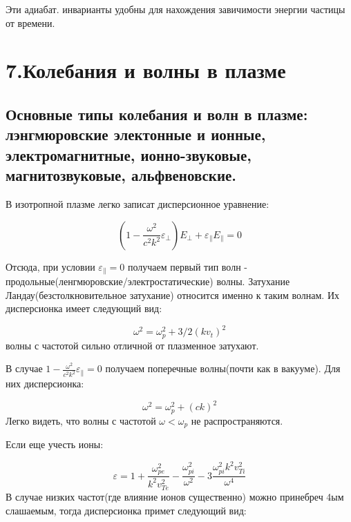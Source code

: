 \documentclass[10pt, a4paper]{article}
\begin{document}
Эти адиабат. инварианты удобны для нахождения завичимости энергии частицы от времени.


\section{ 7.Колебания и волны в плазме}
\label{sec.7}

\subsection{Основные типы колебания и волн в плазме: лэнгмюровские электонные и ионные, электромагнитные, ионно-звуковые, магнитозвуковые, альфвеновские.}
\label{sec.7.1}

В изотропной плазме легко записат дисперсионное уравнение:

\begin{equation}
    \label{eq.7.1}
    \left(1-\frac{\omega^2}{c^2 k^2} \varepsilon_{\perp}\right) E_{\perp} + \varepsilon_{\parallel} E_{\parallel}= 0
\end{equation}

Отсюда, при условии $\varepsilon_{\parallel} = 0$ получаем первый тип волн - продольные(ленгмюровские/электростатические) 
волны. Затухание Ландау(безстолкновительное затухание) относится именно к таким волнам. Их дисперсионка имеет следующий
вид:

\begin{equation}
    \label{eq.7.2}
    \omega^2=\omega_p^2 + 3/2 (k v_{t})^2
\end{equation}
волны с частотой сильно отличной от плазменное затухают.

В случае $1 - \frac{\omega^2}{c^2 k^2} \varepsilon_{\parallel}=0$ получаем поперечные волны(почти как в вакууме). Для них
дисперсионка:

\begin{equation}
    \label{eq.7.3}
    \omega^2=\omega_p^2 + (c k)^2
\end{equation}
Легко видеть, что волны с частотой $\omega < \omega_p$ не распространяются.

Если еще учесть ионы:

\begin{equation}
    \label{eq.7.4}
    \varepsilon=1+\frac{\omega_{pe}^2}{k^2 v_{Te}^2} - \frac{\omega_{pi}^2}{\omega^2}-3\frac{\omega_{pi}^2 k^2 v_{Ti}^2}{\omega^4}
\end{equation}
В случае низких частот(где влияние ионов существенно) можно принебреч 4ым слашаемым, тогда дисперсионка примет следующий вид:
\end{document}
